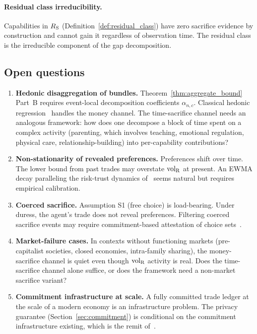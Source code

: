 \paragraph{Residual class irreducibility.}
Capabilities in $R_{\mathrm{S}}$ (Definition~\ref{def:residual_class}) have
zero sacrifice evidence by construction and cannot gain it
regardless of observation time.  The residual class is the
irreducible component of the gap decomposition.

\subsection{Open questions}

\begin{enumerate}

\item \label{oq:hedonic}
\textbf{Hedonic disaggregation of bundles.}
Theorem~\ref{thm:aggregate_bound} Part~B requires event-local
decomposition coefficients $\alpha_{n,c}$.  Classical hedonic
regression~\citep{rosen1974hedonic} handles the money channel.
The time-sacrifice channel needs an analogous framework: how does
one decompose a block of time spent on a complex activity
(parenting, which involves teaching, emotional regulation,
physical care, relationship-building) into per-capability
contributions?

\item \label{oq:nonstationarity}
\textbf{Non-stationarity of revealed preferences.}
Preferences shift over time.  The lower bound from past trades may
overstate ${\operatorname{vol}_{\mathrm{R}}}$ at present.  An EWMA decay paralleling the
risk-trust dynamics of~\citep[Definition~4]{lasser2026scm} seems
natural but requires empirical calibration.

\item \label{oq:coercion}
\textbf{Coerced sacrifice.}
Assumption S1 (free choice) is load-bearing.  Under duress, the
agent's trade does not reveal preferences.  Filtering coerced
sacrifice events may require commitment-based attestation of
choice sets~\citep{lasser2026exo}.

\item \label{oq:market_failure}
\textbf{Market-failure cases.}
In contexts without functioning markets (pre-capitalist societies,
closed economies, intra-family sharing), the money-sacrifice
channel is quiet even though ${\operatorname{vol}_{\mathrm{R}}}$ activity is real.  Does the
time-sacrifice channel alone suffice, or does the framework need
a non-market sacrifice variant?

\item \label{oq:commitment_infra}
\textbf{Commitment infrastructure at scale.}
A fully committed trade ledger at the scale of a modern economy is
an infrastructure problem.  The privacy guarantee
(Section~\ref{sec:commitment}) is conditional on the commitment
infrastructure existing, which is the remit
of~\citep{lasser2026exo}.


\end{enumerate}
